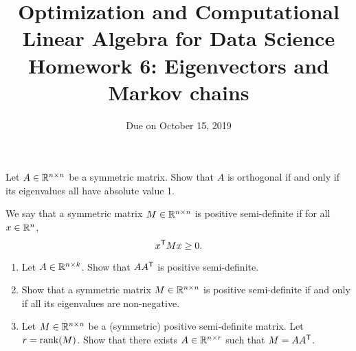 \documentclass[11pt,nocut]{article}
\title{\vspace{-2.0cm}%
	Optimization and Computational Linear Algebra for Data Science\\
Homework 6: Eigenvectors and Markov chains}
\date{\vspace{-1cm}Due on October 15, 2019}
\begin{document}
\maketitle




\begin{problem}[2 points]
	Let $A \in \mathbb{R}^{n \times n}$ be a symmetric matrix. Show that $A$ is orthogonal if and only if its eigenvalues all have absolute value 1.
\end{problem}

\vspace{1mm}

\begin{problem}[3 points]
	We say that a symmetric matrix $M \in \mathbb{R}^{n \times n}$ is positive semi-definite if for all $x \in \mathbb{R}^n$,
	$$
	x^{{\sf T}} M x \geq 0.
	$$
	\begin{enumerate}[label=\normalfont(\textbf{\alph*})]
		\item Let $A \in \mathbb{R}^{n \times k}$. Show that $A A^{{\sf T}}$ is positive semi-definite.
		\item Show that a symmetric matrix $M \in \mathbb{R}^{n \times n}$ is positive semi-definite if and only if all its eigenvalues are non-negative.
		\item Let $M \in \mathbb{R}^{n \times n}$ be a (symmetric) positive semi-definite matrix. Let $r = {{\rm rank}}(M)$. Show that there exists $A \in \mathbb{R}^{n \times r}$ such that $M = AA^{{\sf T}}$.
	\end{enumerate}
	
\end{problem}

\vspace{1mm}
\end{document}
